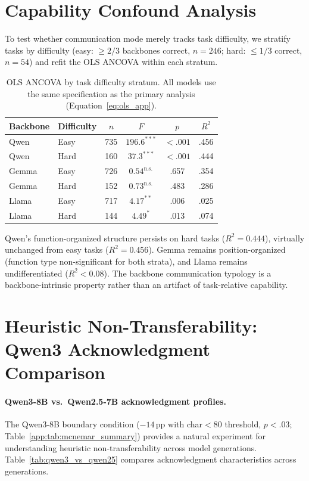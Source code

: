 \section{Capability Confound Analysis}
\label{app:capability-confound}

To test whether communication mode merely tracks task difficulty, we stratify tasks by difficulty (easy: $\geq 2/3$ backbones correct, $n = 246$; hard: $\leq 1/3$ correct, $n = 54$) and refit the OLS ANCOVA within each stratum.

\begin{table}[htbp]
\centering
\caption{OLS ANCOVA by task difficulty stratum. All models use the same specification as the primary analysis (Equation~\ref{eq:ols_app}).}
\label{tab:capability_confound}
\small
\begin{tabular}{llcccc}
\toprule
\textbf{Backbone} & \textbf{Difficulty} & $n$ & $F$ & $p$ & $R^2$ \\
\midrule
Qwen  & Easy & 735 & $196.6^{***}$ & ${<}.001$ & .456 \\
Qwen  & Hard & 160 & $37.3^{***}$ & ${<}.001$ & .444 \\
\midrule
Gemma & Easy & 726 & $0.54^{\text{n.s.}}$ & .657 & .354 \\
Gemma & Hard & 152 & $0.73^{\text{n.s.}}$ & .483 & .286 \\
\midrule
Llama & Easy & 717 & $4.17^{**}$ & .006 & .025 \\
Llama & Hard & 144 & $4.49^{*}$ & .013 & .074 \\
\bottomrule
\end{tabular}
\end{table}

Qwen's function-organized structure persists on hard tasks ($R^2 = 0.444$), virtually unchanged from easy tasks ($R^2 = 0.456$). Gemma remains position-organized (function type non-significant for both strata), and Llama remains undifferentiated ($R^2 < 0.08$). The backbone communication typology is a backbone-intrinsic property rather than an artifact of task-relative capability.

\section{Heuristic Non-Transferability: Qwen3 Acknowledgment Comparison}
\label{app:qwen3_comparison}

\paragraph{Qwen3-8B vs.\ Qwen2.5-7B acknowledgment profiles.}
The Qwen3-8B boundary condition ($-14$\,pp with char$<$80 threshold, $p < .03$; Table~\ref{app:tab:mcnemar_summary}) provides a natural experiment for understanding heuristic non-transferability across model generations. Table~\ref{tab:qwen3_vs_qwen25} compares acknowledgment characteristics across generations.

